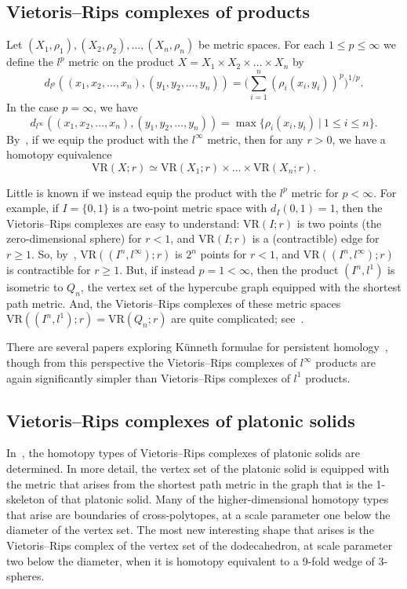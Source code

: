 \documentclass[12pt,a4paper]{amsart}
\theoremstyle{definition}
\newcommand{\vr}[2]{\mathrm{VR}(#1;#2)}
\numberwithin{equation}{section}
\begin{document}
\subsection*{Vietoris--Rips complexes of products}
Let $(X_{1},\rho_{1}), (X_{2},\rho_{2}),\ldots,(X_{n},\rho_{n})$ be metric spaces.
For each $1\le p \leq\infty$ we define the $l^p$ metric on the product $X=X_{1}\times X_{2}\times \ldots\times X_{n}$ by
\[d_{l^p}((x_{1},x_{2},\ldots,x_{n}),(y_{1},y_{2},\ldots,y_{n}))=\bigg(\sum_{i=1}^{n}(\rho_{i}(x_{i},y_{i}))^{p}\bigg)^{1/p}.\]
In the case $p=\infty$, we have
\[d_{l^\infty}((x_{1},x_{2},\ldots,x_{n}),(y_{1},y_{2},\ldots,y_{n}))=\max\{\rho_{i}(x_{i},y_{i})~|~1\le i\le n\}.\]
By~\cite[Proposition~10.2]{AA-VRS1}, if we equip the product with the $l^\infty$ metric, then for any $r>0$, we have a homotopy equivalence 
\[\vr{X}{r}\simeq\vr{X_{1}}{r}\times\ldots\times\vr{X_{n}}{r}.\]

Little is known if we instead equip the product with the $l^p$ metric for $p<\infty$.
For example, if $I=\{0,1\}$ is a two-point metric space with $d_{I}(0,1)=1$, then the Vietoris--Rips complexes are easy to understand: 
$\vr{I}{r}$ is two points (the zero-dimensional sphere) for $r<1$, 
and $\vr{I}{r}$ is a (contractible) edge for $r\ge 1$.
So, by~\cite[Proposition~10.2]{AA-VRS1}, $\vr{(I^n,l^\infty)}{r}$ is $2^n$ points for $r<1$, 
and $\vr{(I^n,l^\infty)}{r}$ is contractible for $r\ge 1$.
But, if instead $p=1<\infty$, then the product $(I^n,l^1)$ is isometric to $Q_n$, the vertex set of the hypercube graph equipped with the shortest path metric.
And, the Vietoris--Rips complexes of these metric spaces $\vr{(I^n,l^1)}{r}=\vr{Q_n}{r}$ are quite complicated; see~\cite{adamaszek2022vietoris,shukla2022vietoris,adams2024lower,feng2023homotopy,feng2023vietoris,feng2024exploring}.

There are several papers exploring K\"unneth formulae for persistent homology~\cite{polterovich2017persistence,gakhar2019kunneth,carlsson2020persistent,bubenik2021homological,VargasRosarioThesis}, though from this perspective the Vietoris--Rips complexes of $l^\infty$ products are again significantly simpler than Vietoris--Rips complexes of $l^1$ products.


\subsection*{Vietoris--Rips complexes of platonic solids}

In~\cite{saleh2023vietoris}, the homotopy types of Vietoris--Rips complexes of platonic solids are determined.
In more detail, the vertex set of the platonic solid is equipped with the metric that arises from the shortest path metric in the graph that is the 1-skeleton of that platonic solid.
Many of the higher-dimensional homotopy types that arise are boundaries of cross-polytopes, at a scale parameter one below the diameter of the vertex set.
The most new interesting shape that arises is the Vietoris--Rips complex of the vertex set of the dodecahedron, at scale parameter two below the diameter, when it is homotopy equivalent to a 9-fold wedge of $3$-spheres.
\end{document}
